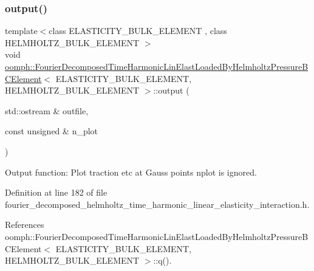 \subsubsection{\texorpdfstring{output()}{output()}\hspace{0.1cm}{\footnotesize\ttfamily [2/4]}}
{\footnotesize\ttfamily template$<$class E\+L\+A\+S\+T\+I\+C\+I\+T\+Y\+\_\+\+B\+U\+L\+K\+\_\+\+E\+L\+E\+M\+E\+NT , class H\+E\+L\+M\+H\+O\+L\+T\+Z\+\_\+\+B\+U\+L\+K\+\_\+\+E\+L\+E\+M\+E\+NT $>$ \\
void \hyperlink{classoomph_1_1FourierDecomposedTimeHarmonicLinElastLoadedByHelmholtzPressureBCElement}{oomph\+::\+Fourier\+Decomposed\+Time\+Harmonic\+Lin\+Elast\+Loaded\+By\+Helmholtz\+Pressure\+B\+C\+Element}$<$ E\+L\+A\+S\+T\+I\+C\+I\+T\+Y\+\_\+\+B\+U\+L\+K\+\_\+\+E\+L\+E\+M\+E\+NT, H\+E\+L\+M\+H\+O\+L\+T\+Z\+\_\+\+B\+U\+L\+K\+\_\+\+E\+L\+E\+M\+E\+NT $>$\+::output (\begin{DoxyParamCaption}\item[{std\+::ostream \&}]{outfile,  }\item[{const unsigned \&}]{n\+\_\+plot }\end{DoxyParamCaption})\hspace{0.3cm}{\ttfamily [inline]}}



Output function\+: Plot traction etc at Gauss points nplot is ignored. 



Definition at line 182 of file fourier\+\_\+decomposed\+\_\+helmholtz\+\_\+time\+\_\+harmonic\+\_\+linear\+\_\+elasticity\+\_\+interaction.\+h.



References oomph\+::\+Fourier\+Decomposed\+Time\+Harmonic\+Lin\+Elast\+Loaded\+By\+Helmholtz\+Pressure\+B\+C\+Element$<$ E\+L\+A\+S\+T\+I\+C\+I\+T\+Y\+\_\+\+B\+U\+L\+K\+\_\+\+E\+L\+E\+M\+E\+N\+T, H\+E\+L\+M\+H\+O\+L\+T\+Z\+\_\+\+B\+U\+L\+K\+\_\+\+E\+L\+E\+M\+E\+N\+T $>$\+::q().

\mbox{\label{classoomph_1_1FourierDecomposedTimeHarmonicLinElastLoadedByHelmholtzPressureBCElement_a147a337796e4e10c43a956a85b441a5e}} 
